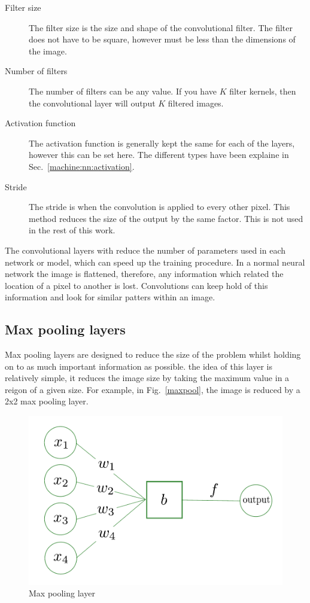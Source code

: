 \begin{description}
\item[Filter size] The filter size is the size and shape of the convolutional filter. The filter does not have to be square, however must be less than the dimensions of the image.

\item[Number of filters] The number of filters can be any value. If you have $K$ filter kernels, then the convolutional layer will output $K$ filtered images.

\item[Activation function] The activation function is generally kept the same for each of the layers, however this can be set here. The different types have been explaine in Sec.~\ref{machine:nn:activation}.

\item[Stride] The stride is when the convolution is applied to every other pixel. This method reduces the size of the output by the same factor. This is not used in the rest of this work.
\end{description}

The convolutional layers with reduce the number of parameters used in each network or model, which can speed up the training procedure.
In a normal neural network the image is flattened, therefore, any information which related the location of a pixel to another is lost. 
Convolutions can keep hold of this information and look for similar patters within an image.

\subsection{Max pooling layers}

Max pooling layers are designed to reduce the size of the problem whilst holding on to as much important information as possible.
the idea of this layer is relatively simple, it reduces the image size by taking the maximum value in a reigon of a given size.
For example, in Fig.~\ref{maxpool}, the image is reduced by a 2x2 max pooling layer.

\begin{figure}
    \centering
    \includegraphics[width=0.5\columnwidth]{C4_cnn/neuron.pdf}
    \caption{Max pooling layer}
    \label{fig:my_label}
\end{figure}

